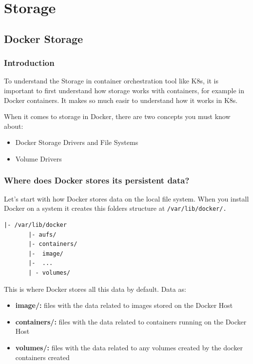 \documentclass{article}
\newenvironment{codetemplate}[1][]{%
  \mybasecolorbox[#1]
  \itshape
}{%
  \endmybasecolorbox
}
\begin{document}
\newpage
\section{Storage}

\subsection{Docker Storage}

\subsubsection{Introduction}

To understand the Storage in container orchestration tool like K8s, it is important to first understand how storage works with containers, for example in Docker containers. It makes so much easir to understand how it works in K8s.

When it comes to storage in Docker, there are two concepts you must know about:
\begin{itemize}
    \item Docker Storage Drivers and File Systems
    \item Volume Drivers
\end{itemize}

\subsubsection{Where does Docker stores its persistent data?}
Let's start with how Docker stores data on the local file system. When you install Docker on a system it creates this folders structure at \verb|/var/lib/docker/.|

\begin{codetemplate}{}
\begin{verbatim}
|- /var/lib/docker
       |- aufs/
       |- containers/
       |-  image/
       |-  ...
       | - volumes/
\end{verbatim}
\end{codetemplate}

This is where Docker stores all this data by default. Data as:

\begin{itemize}
    \item\textbf{image/:}  files with the data related to images stored on the Docker Host
    \item \textbf{containers/:} files with the data related to containers running on the Docker Host
    \item \textbf{volumes/:} files with the data related to any volumes created by the docker containers created
\end{itemize}
\end{document}
